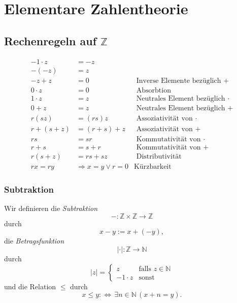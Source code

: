 \section{Elementare Zahlentheorie}
\subsection{Rechenregeln auf $\mathbb{Z}$}

\begin{align*}
	-1\cdot z & =-z                                                                 \\
	-(-z)     & =z                                                                  \\
	-z+z      & =0                      & \text{ Inverse Elemente bezüglich }+      \\
	0\cdot z  & =0                      & \text{ Absorbtion}                        \\
	1\cdot z  & =z                      & \text{ Neutrales Element bezüglich }\cdot \\
	0+z       & =z                      & \text{ Neutrales Element bezüglich }+     \\
	r(sz)     & =(rs)z                  & \text{ Assoziativität von } \cdot         \\
	r+(s+z)   & =(r+s)+z                & \text{ Assoziativität von }+              \\
	rs        & =sr                     & \text{ Kommutativität von }\cdot          \\
	r+s       & =s+r                    & \text{ Kommutativität von }+              \\
	r(s+z)    & =rs+sz                  & \text{ Distributivität}                   \\
	rx=ry     & \Rightarrow x=y\lor r=0 & \text{Kürzbarkeit}
\end{align*}

\subsubsection{Subtraktion}
Wir definieren die \textit{Subtraktion}
\[
	-:\mathbb{Z}\times\mathbb{Z}\rightarrow\mathbb{Z}
\]
durch
\[
	x-y:=x+(-y),
\]
die \textit{Betragsfunktion}
\[
	|\cdot|:\mathbb{Z}\rightarrow\mathbb{N}
\]
durch
\[
	|z|=\begin{cases}
		z         & \text{falls } z\in\mathbb{N} \\
		-1\cdot z & \text{sonst}
	\end{cases}
\]
und die Relation $\leq$ durch
\[
	x\leq y:\Leftrightarrow\,\exists n\in\mathbb{N}\,(x+n=y).
\]

